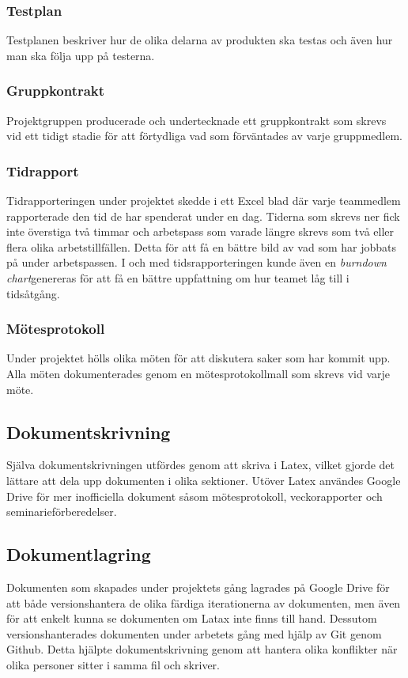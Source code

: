 \subsubsection*{Testplan}
Testplanen beskriver hur de olika delarna av produkten ska testas och även hur man ska följa upp på testerna.

\subsubsection*{Gruppkontrakt}
Projektgruppen producerade och undertecknade ett gruppkontrakt som skrevs vid ett tidigt stadie för att förtydliga vad som förväntades av varje gruppmedlem.

\subsubsection*{Tidrapport}
Tidrapporteringen under projektet skedde i ett Excel blad där varje teammedlem rapporterade den tid de har spenderat under en dag. Tiderna som skrevs ner fick inte överstiga två timmar och arbetspass som varade längre skrevs som två eller flera olika arbetstillfällen. Detta för att få en bättre bild av vad som har jobbats på under arbetspassen. I och med tidsrapporteringen kunde även en \textit{burndown chart}genereras för att få en bättre uppfattning om hur teamet låg till i tidsåtgång.

\subsubsection*{Mötesprotokoll}
Under projektet hölls olika möten för att diskutera saker som har kommit upp. Alla möten dokumenterades genom en mötesprotokollmall som skrevs vid varje möte.

\subsection{Dokumentskrivning}
Själva dokumentskrivningen utfördes genom att skriva i Latex, vilket gjorde det lättare att dela upp dokumenten i olika sektioner. Utöver Latex användes Google Drive för mer inofficiella dokument såsom mötesprotokoll, veckorapporter och seminarieförberedelser.

\subsection{Dokumentlagring}
Dokumenten som skapades under projektets gång lagrades på Google Drive för att både versionshantera de olika färdiga iterationerna av dokumenten, men även för att enkelt kunna se dokumenten om Latax inte finns till hand. Dessutom versionshanterades dokumenten under arbetets gång med hjälp av Git genom Github. Detta hjälpte dokumentskrivning genom att hantera olika konflikter när olika personer sitter i samma fil och skriver.

